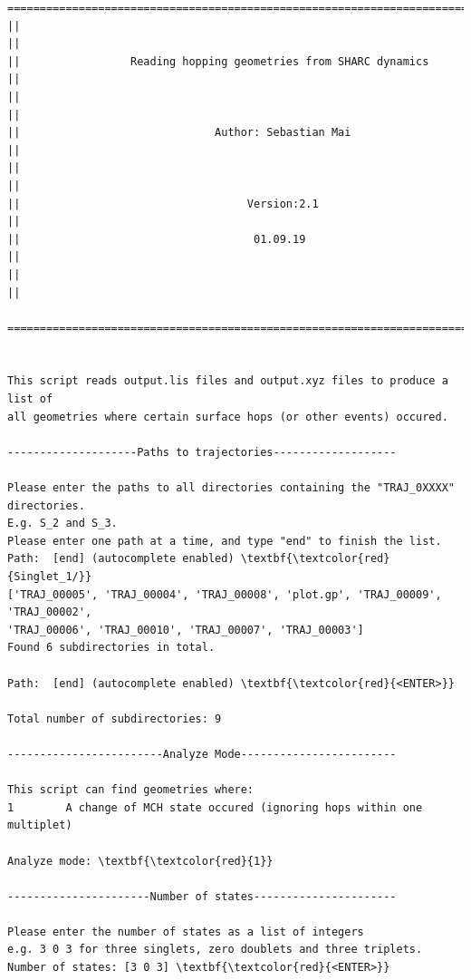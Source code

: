 \documentclass[a4paper,11pt,DIV=15,openany]{scrbook}
\begin{document}
\begin{oframed}
\footnotesize\begin{Verbatim}[commandchars=\\\{\}]
  ================================================================================
||                                                                                ||
||                 Reading hopping geometries from SHARC dynamics                 ||
||                                                                                ||
||                              Author: Sebastian Mai                             ||
||                                                                                ||
||                                   Version:2.1                                  ||
||                                    01.09.19                                    ||
||                                                                                ||
  ================================================================================


This script reads output.lis files and output.xyz files to produce a list of
all geometries where certain surface hops (or other events) occured.

--------------------Paths to trajectories-------------------

Please enter the paths to all directories containing the "TRAJ_0XXXX" directories.
E.g. S_2 and S_3.
Please enter one path at a time, and type "end" to finish the list.
Path:  [end] (autocomplete enabled) \textbf{\textcolor{red}{Singlet_1/}}
['TRAJ_00005', 'TRAJ_00004', 'TRAJ_00008', 'plot.gp', 'TRAJ_00009', 'TRAJ_00002', 
'TRAJ_00006', 'TRAJ_00010', 'TRAJ_00007', 'TRAJ_00003']
Found 6 subdirectories in total.

Path:  [end] (autocomplete enabled) \textbf{\textcolor{red}{<ENTER>}}

Total number of subdirectories: 9

------------------------Analyze Mode------------------------

This script can find geometries where:
1        A change of MCH state occured (ignoring hops within one multiplet)

Analyze mode: \textbf{\textcolor{red}{1}}

----------------------Number of states----------------------

Please enter the number of states as a list of integers
e.g. 3 0 3 for three singlets, zero doublets and three triplets.
Number of states: [3 0 3] \textbf{\textcolor{red}{<ENTER>}}



\end{Verbatim}
\end{oframed}
\end{document}
